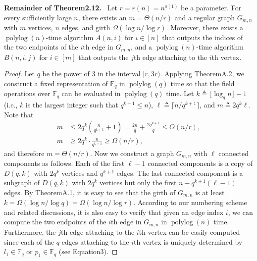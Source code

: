 \documentclass[10pt,a4paper]{article}
\newenvironment{authorclaim}[1]{\par\medskip\noindent\textbf{#1.}\ }{\par\medskip}
\begin{document}
\begin{authorclaim}{Remainder of Theorem2.12}
Let $r=r(n)=n^{o(1)}$ be a parameter. For every sufficiently large $n$, there exists an $m=\Theta(n/r)$ and a regular graph $G_{m,n}$ with $m$ vertices, $n$ edges, and girth $\Omega(\log n/\log r)$. Moreover, there exists a $\operatorname{polylog}(n)$-time algorithm $A(n,i)$ for $i\in[n]$ that outputs the indices of the two endpoints of the $i$th edge in $G_{m,n}$, and a $\operatorname{polylog}(n)$-time algorithm $B(n,i,j)$ for $i\in[m]$ that outputs the $j$th edge attaching to the $i$th vertex.
\end{authorclaim}
\begin{proof}
Let $q$ be the power of 3 in the interval $[r,3r)$. Applying TheoremA.2, we construct a fixed representation of $\mathbb F_q$ in $\operatorname{polylog}(q)$ time so that the field operations over $\mathbb F_q$ can be evaluated in $\operatorname{polylog}(q)$ time. Let $k\triangleq\lfloor\log_qn\rfloor-1$ (i.e., $k$ is the largest integer such that $q^{k+1}\le n$), $\ell\triangleq\lceil n/q^{k+1}\rceil$, and $m\triangleq2q^k\ell$. Note that
\begin{align*}
m&\le2q^k\left(\frac n{q^{k+1}}+1\right)=\frac{2n}q+\frac{2q^{k+1}}q\le O(n/r),\\
m&\ge2q^k\cdot\frac n{q^{k+1}}\ge\Omega(n/r),
\end{align*}
and therefore $m=\Theta(n/r)$. Now we construct a graph $G_{m,n}$ with $\ell$ connected components as follows. Each of the first $\ell-1$ connected components is a copy of $D(q,k)$ with $2q^k$ vertices and $q^{k+1}$ edges. The last connected component is a subgraph of $D(q,k)$ with $2q^k$ vertices but only the first $n-q^{k+1}(\ell-1)$ edges.
By TheoremA.1, it is easy to see that the girth of $G_{m,n}$ is at least $k=\Omega(\log n/\log q)=\Omega(\log n/\log r)$. According to our numbering scheme and related discussions, it is also easy to verify that given an edge index $i$, we can compute the two endpoints of the $i$th edge in $G_{m,n}$ in $\operatorname{polylog}(n)$ time. Furthermore, the $j$th edge attaching to the $i$th vertex can be easily computed since each of the $q$ edges attaching to the $i$th vertex is uniquely determined by $l_1\in\mathbb F_q$ or $p_1\in\mathbb F_q$ (see Equation3).
\end{proof}

\end{document}

